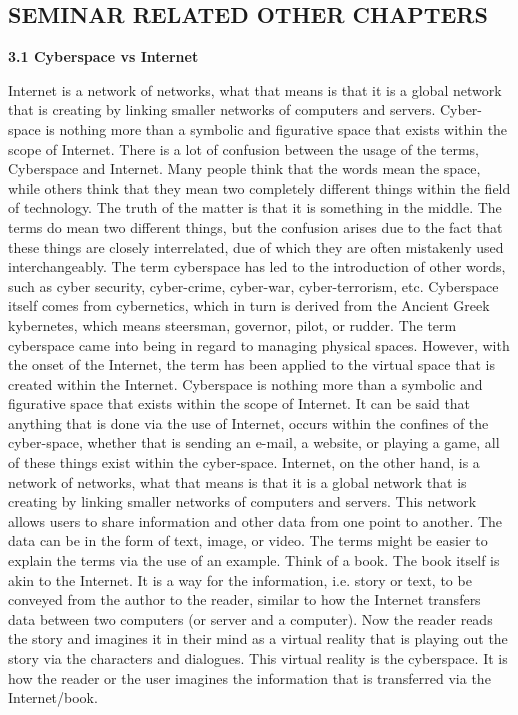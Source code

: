 \documentclass[11pt,a4paper]{article}
\begin{document}
\newpage
\begin{center}
\section{SEMINAR RELATED OTHER CHAPTERS}
{\setlength{\baselineskip}{1.5\baselineskip} }									
\end{center}

\textbf{3.1   Cyberspace vs Internet }\\
\begin{center}


Internet is a network of networks, what that means is that it is a global network that is creating by linking smaller networks of computers and servers. Cyber-space is nothing more than a symbolic and figurative space that exists within the scope of Internet.
There is a lot of confusion between the usage of the terms, Cyberspace and Internet. Many people think that the words mean the space, while others think that they mean two completely different things within the field of technology. The truth of the matter is that it is something in the middle. The terms do mean two different things, but the confusion arises due to the fact that these things are closely interrelated, due of which they are often mistakenly used interchangeably.
The term cyberspace has led to the introduction of other words, such as cyber security, cyber-crime, cyber-war, cyber-terrorism, etc. Cyberspace itself comes from cybernetics, which in turn is derived from the Ancient Greek kybernetes, which means steersman, governor, pilot, or rudder.
The term cyberspace came into being in regard to managing physical spaces. However, with the onset of the Internet, the term has been applied to the virtual space that is created within the Internet.
Cyberspace is nothing more than a symbolic and figurative space that exists within the scope of Internet. It can be said that anything that is done via the use of Internet, occurs within the confines of the cyber-space, whether that is sending an e-mail, a website, or playing a game, all of these things exist within the cyber-space.
Internet, on the other hand, is a network of networks, what that means is that it is a global network that is creating by linking smaller networks of computers and servers. This network allows users to share information and other data from one point to another. The data can be in the form of text, image, or video.
The terms might be easier to explain the terms via the use of an example. Think of a book. The book itself is akin to the Internet. It is a way for the information, i.e. story or text, to be conveyed from the author to the reader, similar to how the Internet transfers data between two computers (or server and a computer).
Now the reader reads the story and imagines it in their mind as a virtual reality that is playing out the story via the characters and dialogues. This virtual reality is the cyberspace. It is how the reader or the user imagines the information that is transferred via the Internet/book.
\end{center}
\end{document}
